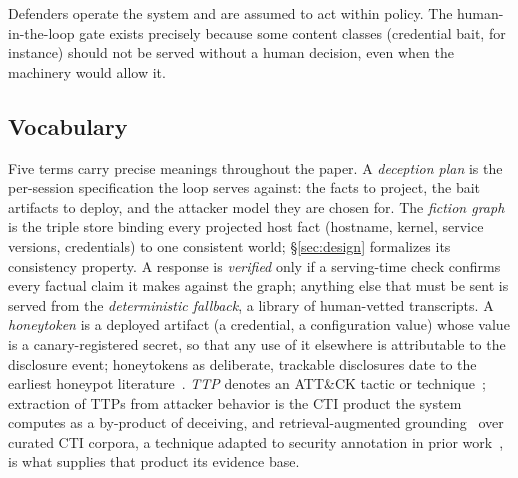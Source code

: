 Defenders operate the system and are assumed to act within policy. The human-in-the-loop
gate exists precisely because some content classes (credential bait, for
instance) should not be served without a human decision, even when the
machinery would allow it.

\subsection{Vocabulary}
\label{sec:vocab}
Five terms carry precise meanings throughout the paper. A \emph{deception
plan} is the per-session specification the loop serves against: the facts
to project, the bait artifacts to deploy, and the attacker model they are
chosen for. The \emph{fiction graph} is the triple store binding every
projected host fact (hostname, kernel, service versions, credentials) to
one consistent world; \S\ref{sec:design} formalizes its consistency
property. A response is \emph{verified} only if a serving-time check
confirms every factual claim it makes against the graph; anything else
that must be sent is served from the \emph{deterministic fallback}, a
library of human-vetted transcripts. A \emph{honeytoken} is a deployed
artifact (a credential, a configuration value) whose value is a
canary-registered secret, so that any use of it elsewhere is attributable
to the disclosure event; honeytokens as deliberate, trackable
disclosures date to the earliest honeypot literature~\cite{spitzner2003}. \emph{TTP} denotes an ATT\&CK tactic or
technique~\cite{roy2023}; extraction of TTPs from attacker behavior is
the CTI product the system computes as a by-product of deceiving, and
retrieval-augmented grounding~\cite{lewis2020} over curated CTI corpora,
a technique adapted to security annotation in prior
work~\cite{lekssays2025}, is what supplies that product its evidence base.

